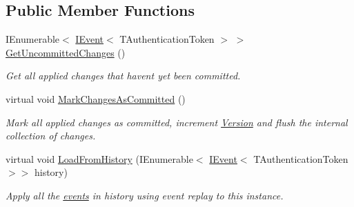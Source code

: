 \subsection*{Public Member Functions}
\begin{DoxyCompactItemize}
\item 
I\+Enumerable$<$ \hyperlink{interfaceCqrs_1_1Events_1_1IEvent}{I\+Event}$<$ T\+Authentication\+Token $>$ $>$ \hyperlink{classCqrs_1_1Akka_1_1Domain_1_1AkkaAggregateRoot_a2d11510fec0129ba318f63f7103aeec0_a2d11510fec0129ba318f63f7103aeec0}{Get\+Uncommitted\+Changes} ()
\begin{DoxyCompactList}\small\item\em Get all applied changes that haven\textquotesingle{}t yet been committed. \end{DoxyCompactList}\item 
virtual void \hyperlink{classCqrs_1_1Akka_1_1Domain_1_1AkkaAggregateRoot_a0d2615067175e5f8249bb2dc3d17ee0b_a0d2615067175e5f8249bb2dc3d17ee0b}{Mark\+Changes\+As\+Committed} ()
\begin{DoxyCompactList}\small\item\em Mark all applied changes as committed, increment \hyperlink{classCqrs_1_1Akka_1_1Domain_1_1AkkaAggregateRoot_a4b526322c63542b1da2a700ff1b48d0c_a4b526322c63542b1da2a700ff1b48d0c}{Version} and flush the internal collection of changes. \end{DoxyCompactList}\item 
virtual void \hyperlink{classCqrs_1_1Akka_1_1Domain_1_1AkkaAggregateRoot_af6d84b07d4e9475bb88e769ac9081830_af6d84b07d4e9475bb88e769ac9081830}{Load\+From\+History} (I\+Enumerable$<$ \hyperlink{interfaceCqrs_1_1Events_1_1IEvent}{I\+Event}$<$ T\+Authentication\+Token $>$$>$ history)
\begin{DoxyCompactList}\small\item\em Apply all the \hyperlink{}{events} in {\itshape history}  using event replay to this instance. \end{DoxyCompactList}\end{DoxyCompactItemize}
